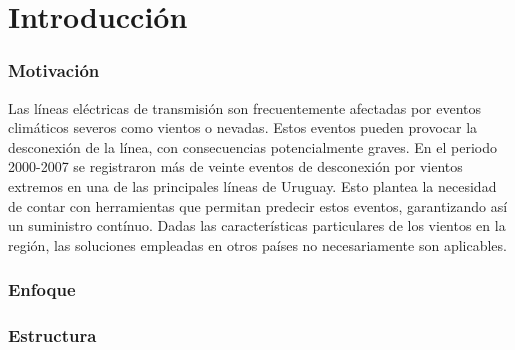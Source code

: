 \chapter{Introducción}
 
\subsection{Motivación}
Las líneas eléctricas de transmisión son frecuentemente afectadas por eventos climáticos severos como vientos o nevadas. Estos eventos pueden provocar la desconexión de la línea, con consecuencias potencialmente graves. En el periodo 2000-2007 se registraron más de veinte eventos de desconexión por vientos extremos en una de las principales líneas de Uruguay. Esto plantea la necesidad de contar con herramientas que permitan predecir estos eventos, garantizando así un suministro contínuo. Dadas las características particulares de los vientos en la región, las soluciones empleadas en otros países no necesariamente son aplicables.

\subsection{Enfoque}

\subsection{Estructura}